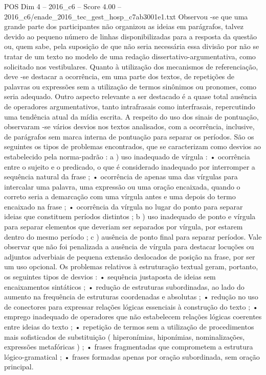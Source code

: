 \begin{textsample}{POS Dim 4 – 2016\_c6 – Score 4.00 – 2016\_c6/enade\_2016\_tec\_gest\_hosp\_c7ab3001e1.txt}
Observou -se que uma grande parte dos participantes não organizou as ideias em parágrafos, talvez devido ao pequeno número de linhas disponibilizadas para a resposta da questão ou, quem sabe, pela suposição de que não seria necessária essa divisão por não se tratar de um texto no modelo de uma redação dissertativo-argumentativa, como solicitado nos vestibulares.
Quanto à utilização dos mecanismos de referenciação, deve -se destacar a ocorrência, em uma parte dos textos, de repetições de palavras ou expressões sem a utilização de termos sinônimos ou pronomes, como seria adequado.
Outro aspecto relevante a ser destacado é a quase total ausência de operadores argumentativos, tanto intrafrasais como interfrasais, repercutindo uma tendência atual da mídia escrita.
A respeito do uso dos sinais de pontuação, observaram -se vários desvios nos textos analisados, com a ocorrência, inclusive, de parágrafos sem marca interna de pontuação para separar os períodos.
São os seguintes os tipos de problemas encontrados, que se caracterizam como desvios ao estabelecido pela norma-padrão : a ) uso inadequado de vírgula : • ocorrência entre o sujeito e o predicado, o que é considerado inadequado por interromper a sequência natural da frase ; • ocorrência de apenas uma das vírgulas para intercalar uma palavra, uma expressão ou uma oração encaixada, quando o correto seria a demarcação com uma vírgula antes e uma depois do termo encaixado na frase ; • ocorrência da vírgula no lugar do ponto para separar ideias que constituem períodos distintos ; b ) uso inadequado de ponto e vírgula para separar elementos que deveriam ser separados por vírgula, por estarem dentro do mesmo período ; c ) ausência de ponto final para separar períodos.
Vale observar que não foi penalizada a ausência de vírgula para destacar locuções ou adjuntos adverbiais de pequena extensão deslocados de posição na frase, por ser um uso opcional.
Os problemas relativos à estruturação textual geram, portanto, os seguintes tipos de desvios : • sequência justaposta de ideias sem encaixamentos sintáticos ; • redução de estruturas subordinadas, ao lado do aumento na frequência de estruturas coordenadas e absolutas ; • redução no uso de conectores para expressar relações lógicas essenciais à construção do texto ; • emprego inadequado de operadores que não estabelecem relações lógicas coerentes entre ideias do texto ; • repetição de termos sem a utilização de procedimentos mais sofisticados de substituição ( hiperonímias, hiponímias, nominalizações, expressões metafóricas ) ; • frases fragmentadas que comprometem a estrutura lógico-gramatical ; • frases formadas apenas por oração subordinada, sem oração principal.

\end{textsample}

